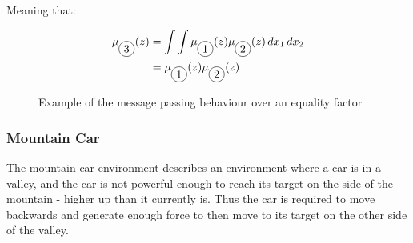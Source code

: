\documentclass{article}
\newcommand*\circled[1]{\tikz[baseline=(char.base)]{
            \node[shape=circle,draw,inner sep=2pt] (char) {#1};}}
\begin{document}
Meaning that:

\begin{figure}[h]
    \centering
    \begin{minipage}{0.45\textwidth}
        \begin{equation*}
        \begin{aligned}
        	\mu_{\circled{3}}(z) &= \int \int \mu_{\circled{1}}(z) \mu_{\circled{2}}(z) \, dx_1 \, dx_2 \\
        	&= \mu_{\circled{1}}(z) \mu_{\circled{2}}(z)
        \end{aligned}
        \end{equation*}
    \end{minipage}
    \begin{minipage}{0.45\textwidth}
        \centering
        \label{fig:equality_factor}
    \end{minipage}
    \caption{Example of the message passing behaviour over an equality factor}
\end{figure}

\subsubsection{Mountain Car}


The mountain car environment describes an environment where a car is in a valley, and the car is not powerful enough to reach its target on the side of the mountain - higher up than it currently is. Thus the car is required to move backwards and generate enough force to then move to its target on the other side of the valley. 
\end{document}
